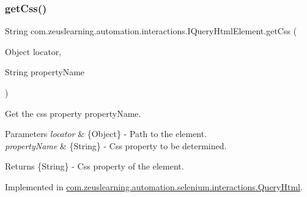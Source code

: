 \hypertarget{interfacecom_1_1zeuslearning_1_1automation_1_1interactions_1_1IQueryHtmlElement_a5ba6af3b91bc23e1d3bb3551a78cea5a}{}\label{interfacecom_1_1zeuslearning_1_1automation_1_1interactions_1_1IQueryHtmlElement_a5ba6af3b91bc23e1d3bb3551a78cea5a} 
\subsubsection{\texorpdfstring{get\+Css()}{getCss()}}
{\footnotesize\ttfamily String com.\+zeuslearning.\+automation.\+interactions.\+I\+Query\+Html\+Element.\+get\+Css (\begin{DoxyParamCaption}\item[{Object}]{locator,  }\item[{String}]{property\+Name }\end{DoxyParamCaption})}

Get the css property {\ttfamily property\+Name}.


\begin{DoxyParams}{Parameters}
{\em locator} & \{Object\} -\/ Path to the element. \\
\hline
{\em property\+Name} & \{String\} -\/ Css property to be determined.\\
\hline
\end{DoxyParams}
\begin{DoxyReturn}{Returns}
\{String\} -\/ Css property of the element. 
\end{DoxyReturn}


Implemented in \hyperlink{classcom_1_1zeuslearning_1_1automation_1_1selenium_1_1interactions_1_1QueryHtml_aeb4ba1cab004dc64db959c70a78fd0ab}{com.\+zeuslearning.\+automation.\+selenium.\+interactions.\+Query\+Html}.

\hypertarget{interfacecom_1_1zeuslearning_1_1automation_1_1interactions_1_1IQueryHtmlElement_a4a495a5c92eb847a4db5f01ec4d11212}{}\label{interfacecom_1_1zeuslearning_1_1automation_1_1interactions_1_1IQueryHtmlElement_a4a495a5c92eb847a4db5f01ec4d11212} 
